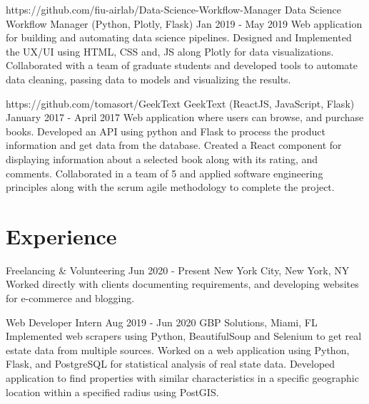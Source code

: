 \documentclass[letterpaper,10pt]{article}
\begin{document}
  \projectHeading
    {https://github.com/fiu-airlab/Data-Science-Workflow-Manager}
    {Data Science Workflow Manager}
    {(Python, Plotly, Flask)}
    {Jan 2019 - May 2019}
    {Web application for building and automating data science pipelines.}
  \listStart
    \bulletItem
      {Designed and Implemented the UX/UI using HTML, CSS and, JS along Plotly for data visualizations. }
    \bulletItem
      {Collaborated with a team of graduate students and developed tools to automate data cleaning, passing data to models and visualizing the results.}
  \listEnd

  \projectHeading
    {https://github.com/tomasort/GeekText}
    {GeekText}
    {(ReactJS, JavaScript, Flask)}
    {January 2017 - April 2017}
    {Web application where users can browse, and purchase books.}
  \listStart
    \bulletItem
      {Developed an API using python and Flask to process the product information and get data from the database. }
    \bulletItem
      {Created a React component for displaying information about a selected book along with its rating, and comments. }
    \bulletItem
      {Collaborated in a team of 5 and applied software engineering principles along with the scrum agile methodology to complete the project. }
  \listEnd


\sectionEnd
  
\section{Experience}
\sectionStart

  \jobHeading
    {Freelancing \& Volunteering}
    {Jun 2020 - Present}
    {New York City, New York, NY}
  \listStart
    \bulletItem
    {Worked directly with clients documenting requirements, and developing websites for e-commerce and blogging.}
  \listEnd

  \jobHeading
    {Web Developer Intern}
    {Aug 2019 - Jun 2020}
    {GBP Solutions, Miami, FL}
  \listStart
    \bulletItem
    {Implemented web scrapers using Python, BeautifulSoup and Selenium to get real estate data from multiple sources.}
    \bulletItem
    {Worked on a web application using Python, Flask, and PostgreSQL for statistical analysis of real state data.}
    \bulletItem
    {Developed application to find properties with similar characteristics in a specific geographic location within a specified radius using PostGIS.}
  \listEnd
\end{document}
